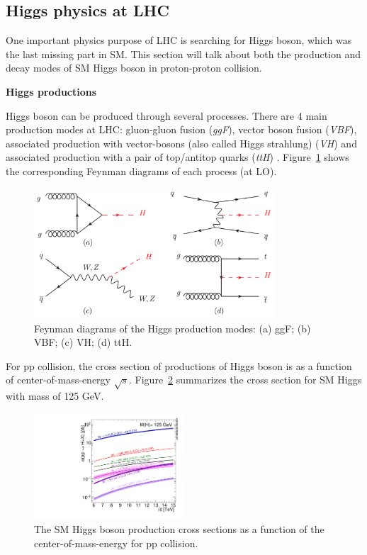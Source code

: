 \subsection{Higgs physics at LHC}
\label{higgs}

One important physics purpose of LHC is searching for Higgs boson, which was the last missing part in SM.
This section will talk about both the production and decay modes of SM Higgs boson in proton-proton collision.

\textbf{Higgs productions}

Higgs boson can be produced through several processes.
There are 4 main production modes at LHC: gluon-gluon fusion (\textit{ggF}), vector boson fusion (\textit{VBF}),
associated production with vector-bosons (also called Higgs strahlung) (\textit{VH}) 
and associated production with a pair of top/antitop quarks (\textit{ttH}) \cite{Grojean:2243593}.
Figure~\ref{fig:higgs_productions_fd} shows the corresponding Feynman diagrams of each process (at LO).
\begin{figure}[!htb]
  \centering
  \includegraphics[width=0.8\textwidth]{figures/Theory/Figures_FeynmanHprod.png}
  \caption{Feynman diagrams of the Higgs production modes:
	   (a) ggF; (b) VBF; (c) VH; (d) ttH.}
  \label{fig:higgs_productions_fd}
\end{figure}
For pp collision, the cross section of productions of Higgs boson is as a function of center-of-mass-energy $\sqrt{s}$. 
Figure~\ref{fig:higgs_productions_xs} summarizes the cross section for SM Higgs with mass of 125 GeV.\\
\begin{figure}[!htb]
  \centering
  \includegraphics[width=0.5\textwidth]{figures/Theory/Plot_Escan_H125_new_sqrt.pdf}
  \caption{The SM Higgs boson production cross sections as a function of the center-of-mass-energy for pp collision.}
  \label{fig:higgs_productions_xs}
\end{figure}
